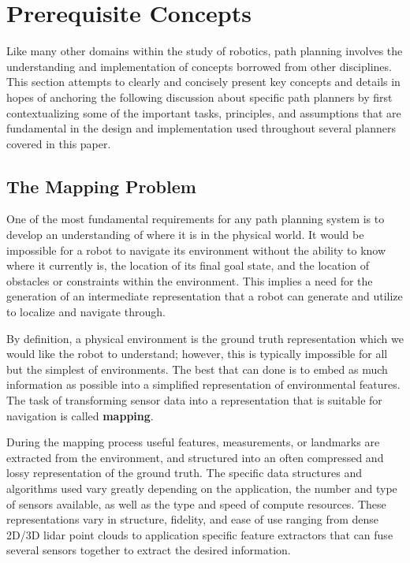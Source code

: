 \section{Prerequisite Concepts}

Like many other domains within the study of robotics, path planning involves the understanding and implementation of concepts borrowed from other disciplines. This section attempts to clearly and concisely present key concepts and details in hopes of anchoring the following discussion about specific path planners by first contextualizing some of the important tasks, principles, and assumptions that are fundamental in the design and implementation used throughout several planners covered in this paper. 

\subsection{The Mapping Problem}

One of the most fundamental requirements for any path planning system is to develop an understanding of where it is in the physical world. It would be impossible for a robot to navigate its environment without the ability to know where it currently is, the location of its final goal state, and the location of obstacles or constraints within the environment. This implies a need for the generation of an intermediate representation that a robot can generate and utilize to localize and navigate through. 

By definition, a physical environment is the ground truth representation which we would like the robot to understand; however, this is typically impossible for all but the simplest of environments. The best that can done is to embed as much information as possible into a simplified representation of environmental features. The task of transforming sensor data into a representation that is suitable for navigation is called \textbf{mapping}.  

During the mapping process useful features, measurements, or landmarks are extracted from the environment, and structured into an often compressed and lossy representation of the ground truth. The specific data structures and algorithms used vary greatly depending on the application, the number and type of sensors available, as well as the type and speed of compute resources. These representations vary in structure, fidelity, and ease of use ranging from dense 2D/3D lidar point clouds to application specific feature extractors that can fuse several sensors together to extract the desired information. 

